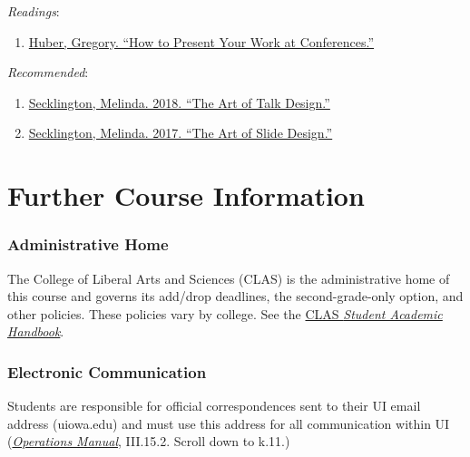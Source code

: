 \documentclass[]{article}
\providecommand{\tightlist}{%
  \setlength{\itemsep}{0pt}\setlength{\parskip}{0pt}}
\begin{document}
\emph{Readings}:

\begin{enumerate}
\def\labelenumi{\arabic{enumi}.}
\tightlist
\item
  \href{https://huber.research.yale.edu/materials/HowToPresentAtConferences.pdf}{Huber,
  Gregory. ``How to Present Your Work at Conferences.''}
\end{enumerate}

\emph{Recommended}:

\begin{enumerate}
\def\labelenumi{\arabic{enumi}.}
\tightlist
\item
  \href{https://speakerdeck.com/mseckington/the-art-of-talk-design}{Secklington,
  Melinda. 2018. ``The Art of Talk Design.''}
\item
  \href{https://speakerdeck.com/mseckington/the-art-of-slide-design}{Secklington,
  Melinda. 2017. ``The Art of Slide Design.''}
\end{enumerate}

\pagebreak

\hypertarget{further-course-information}{%
\section{Further Course Information}\label{further-course-information}}

\hypertarget{administrative-home}{%
\subsubsection{Administrative Home}\label{administrative-home}}

The College of Liberal Arts and Sciences (CLAS) is the administrative
home of this course and governs its add/drop deadlines, the
second-grade-only option, and other policies. These policies vary by
college. See the \href{http://clas.uiowa.edu/students/handbook}{CLAS
\emph{Student Academic Handbook}}.

\hypertarget{electronic-communication}{%
\subsubsection{Electronic
Communication}\label{electronic-communication}}

Students are responsible for official correspondences sent to their UI
email address (uiowa.edu) and must use this address for all
communication within UI
(\href{http://www.uiowa.edu/~our/opmanual/iii/15.htm\#152}{\emph{Operations
Manual}}, III.15.2. Scroll down to k.11.)
\end{document}
